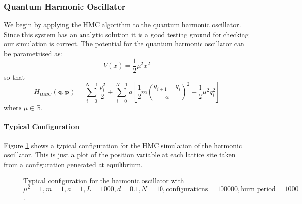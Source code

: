 \documentclass[12pt]{article}
\begin{document}
         
            

    
        \subsubsection{Quantum Harmonic Oscillator}
            \label{sec:QuantumHarmonicOscillator}
            We begin by applying the HMC algorithm to the quantum harmonic oscillator. Since this system has an analytic solution it is a good testing ground for checking our simulation is correct. The potential for the quantum harmonic oscillator can be parametrised as:
            \begin{equation}
                \label{eq:HarmonicPotential}
                V\left(x\right) = \frac{1}{2}\mu^2x^2
            \end{equation}
            so that 
            \begin{equation}
                \label{eq:HarmonicHMCHamiltonian}
                H_{HMC}\left(\bm{q},\bm{p}\right) = \sum_{i=0}^{N-1} \frac{p_i^2}{2} + \sum_{i=0}^{N-1} a \left[\frac{1}{2}m\left(\frac{q_{i+1}-q_{i}}{a}\right)^2 + \frac{1}{2}\mu^2q_i^2\right]
            \end{equation}
            where $\mu \in \mathbb{R}$.

            \paragraph{Typical Configuration}
                Figure \ref{fig:TypicalHarmonicPath} shows a typical configuration for the HMC simulation of the harmonic oscillator. This is just a plot of the position variable at each lattice site taken from a configuration generated at equilibrium.
                \begin{figure}
                    \centering
                        \caption{Typical configuration for the harmonic oscillator with $\mu^2 = 1, m = 1, a = 1, L = 1000, d = 0.1, N = 10, \text{configurations} = 100000, \text{burn period} = 1000$.}
                        \label{fig:TypicalHarmonicPath}
                \end{figure}
\end{document}

